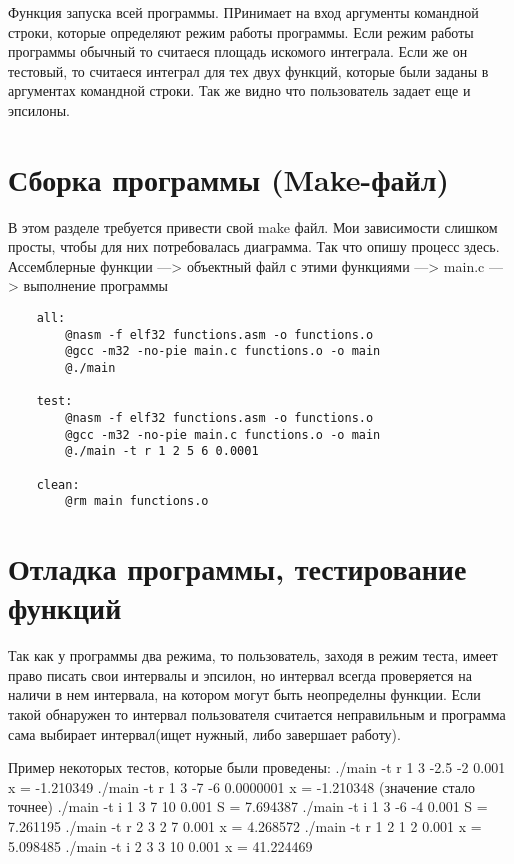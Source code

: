 \documentclass[a4paper,12pt,titlepage,finall]{article}
\begin{document}
Функция запуска всей программы. ПРинимает на вход аргументы командной строки, которые определяют режим работы программы.
Если режим работы программы обычный то считаеся площадь искомого интеграла. 
Если же он тестовый, то считаеся интеграл для тех двух функций, которые были заданы в аргументах командной строки.
Так же видно что пользователь задает еще и эпсилоны.


\newpage

\section{Сборка программы (Make-файл)}
В этом разделе требуется привести свой make файл. Мои зависимости слишком просты, чтобы для них потребовалась диаграмма. 
Так что опишу процесс здесь. \\
Ассемблерные функции ---> объектный файл с этими функциями ---> main.c ---> выполнение программы

\begin{verbatim}
    all:
        @nasm -f elf32 functions.asm -o functions.o  
        @gcc -m32 -no-pie main.c functions.o -o main  
        @./main  

    test:
        @nasm -f elf32 functions.asm -o functions.o  
        @gcc -m32 -no-pie main.c functions.o -o main  
        @./main -t r 1 2 5 6 0.0001

    clean:
        @rm main functions.o
\end{verbatim}


\newpage

\section{Отладка программы, тестирование функций}
Так как у программы два режима, то пользователь, заходя в режим теста, имеет право писать свои интервалы и эпсилон,
но интервал всегда проверяется на наличи в нем интервала, на котором могут быть неопределны функции.
Если такой обнаружен то интервал пользователя считается неправильным и программа сама выбирает интервал(ищет нужный, либо завершает работу).

Пример некоторых тестов, которые были проведены:
./main -t r 1 3 -2.5 -2 0.001            x = -1.210349
./main -t r 1 3 -7 -6 0.0000001          x = -1.210348 (значение стало точнее)
./main -t i 1 3 7 10 0.001               S = 7.694387
./main -t i 1 3 -6 -4 0.001              S = 7.261195
./main -t r 2 3 2 7 0.001                x = 4.268572
./main -t r 1 2 1 2 0.001                x = 5.098485
./main -t i 2 3 3 10 0.001               x = 41.224469
\end{document}
